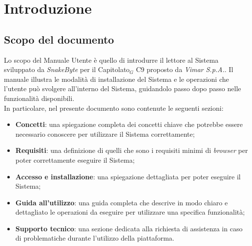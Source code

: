 \documentclass[10pt, letterpaper]{article}
\begin{document}
\makeTitlePage

\newpage 
{}
\makeChangelog

\newpage

\tableofcontents

\newpage

\listoffigures

\newpage

\section{Introduzione}

\subsection{Scopo del documento}
Lo scopo del Manuale Utente è quello di introdurre il lettore al Sistema sviluppato da \textit{SnakeByte} per il Capitolato${_G}$ C9 proposto da \textit{Vimar S.p.A.}.
Il manuale illustra le modalità di installazione del Sistema e le operazioni che l'utente può svolgere all'interno del Sistema, guidandolo passo dopo passo nelle funzionalità disponibili.
\\In particolare, nel presente documento sono contenute le seguenti sezioni:
\begin{itemize}
    \item \textbf{Concetti}: una spiegazione completa dei concetti chiave che potrebbe essere necessario conoscere per utilizzare il Sistema correttamente;
    \item \textbf{Requisiti}: una definizione di quelli che sono i requisiti minimi di \textit{browser} per poter correttamente eseguire il Sistema;
    \item \textbf{Accesso e installazione}: una spiegazione dettagliata per poter eseguire il Sistema;
    \item \textbf{Guida all'utilizzo}: una guida completa che descrive in modo chiaro e dettagliato le operazioni da eseguire per utilizzare una specifica funzionalità;
    \item \textbf{Supporto tecnico}: una sezione dedicata alla richiesta di assistenza in caso di problematiche durante l'utilizzo della piattaforma.
\end{itemize}
\end{document}
